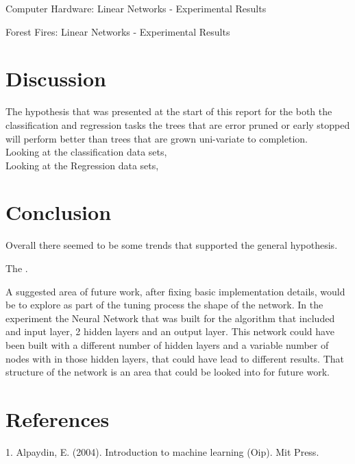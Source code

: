 \documentclass[twoside,11pt]{article}
\begin{document}
\begin{table}[h]
	\centering
	\caption{Computer Hardware: Linear Networks - Experimental Results}
	\label{tab:tale5}
\end{table}

\begin{table}[h]
	\centering
	\caption{Forest Fires: Linear Networks - Experimental Results}
	\label{tab:table6}
\end{table}

\newpage
\newpage


\section{Discussion}
\hspace*{10mm} The hypothesis that was presented at the start of this report for the both the classification and regression tasks the trees that are error pruned or early stopped will perform better than trees that are grown uni-variate to completion.\\
\hspace*{10mm} Looking at the classification data sets,  \\

\hspace*{10mm} Looking at the Regression data sets,\\


\section{Conclusion}
\hspace*{10mm} Overall there seemed to be some trends that supported the general hypothesis. \newline

\hspace*{10mm} The .\newline

\hspace*{10mm} A suggested area of future work, after fixing basic implementation details, would be to explore as part of the tuning process the shape of the network. In the experiment the Neural Network that was built for the algorithm that included and input layer, 2 hidden layers and an output layer. This network could have been built with a different number of hidden layers and a variable number of nodes with in those hidden layers, that could have lead to different results. That structure of the network is an area that could be looked into for future work. \newline

\section{References}
1. Alpaydin, E. (2004). Introduction to machine learning (Oip). Mit Press. 

\newpage
\end{document}
